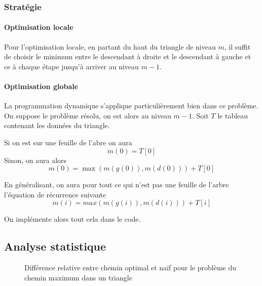 \documentclass[a4paper,english,french]{article}
\begin{document}
\subsubsection*{Stratégie}

\paragraph*{Optimisation locale} Pour l'optimisation locale, en partant du haut du triangle de niveau $m$, il suffit de choisir le minimum entre le descendant à droite et le descendant à gauche et ce à chaque étape jusqu'à arriver au niveau $m - 1$.

\paragraph*{Optimisation globale} La programmation dynamique s'applique particulièrement bien dans ce problème. On suppose le problème résolu, on est alors au niveau $m-1$. Soit $T$ le tableau contenant les données du triangle.

Si on est sur une feuille de l'abre on aura \[ m(0) = T[0] \] Sinon, on aura alors \[ m(0) = \max(m(g(0)), m(d(0))) + T[0] \]

En généralisant, on aura pour tout ce qui n'est pas une feuille de l'arbre l'équation de récurrence suivante \[ m(i) = max(m(g(i)), m(d(i))) + T[i] \]

On implémente alors tout cela dans le code.

\subsection*{Analyse statistique}

\begin{figure}
\centering
{}
\caption{Différence relative entre chemin optimal et naïf pour le problème du chemin maximum dans un triangle}
\end{figure}
\end{document}

